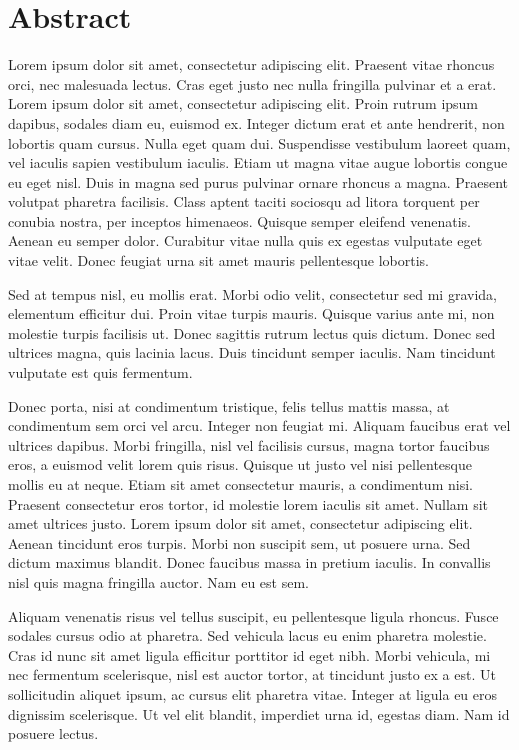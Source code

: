 \section{Abstract}

Lorem ipsum dolor sit amet, consectetur adipiscing elit. Praesent vitae rhoncus orci, nec malesuada lectus. Cras eget justo nec nulla fringilla pulvinar et a erat. Lorem ipsum dolor sit amet, consectetur adipiscing elit. Proin rutrum ipsum dapibus, sodales diam eu, euismod ex. Integer dictum erat et ante hendrerit, non lobortis quam cursus. Nulla eget quam dui. Suspendisse vestibulum laoreet quam, vel iaculis sapien vestibulum iaculis. Etiam ut magna vitae augue lobortis congue eu eget nisl. Duis in magna sed purus pulvinar ornare rhoncus a magna. Praesent volutpat pharetra facilisis. Class aptent taciti sociosqu ad litora torquent per conubia nostra, per inceptos himenaeos. Quisque semper eleifend venenatis. Aenean eu semper dolor. Curabitur vitae nulla quis ex egestas vulputate eget vitae velit. Donec feugiat urna sit amet mauris pellentesque lobortis.

Sed at tempus nisl, eu mollis erat. Morbi odio velit, consectetur sed mi gravida, elementum efficitur dui. Proin vitae turpis mauris. Quisque varius ante mi, non molestie turpis facilisis ut. Donec sagittis rutrum lectus quis dictum. Donec sed ultrices magna, quis lacinia lacus. Duis tincidunt semper iaculis. Nam tincidunt vulputate est quis fermentum.

Donec porta, nisi at condimentum tristique, felis tellus mattis massa, at condimentum sem orci vel arcu. Integer non feugiat mi. Aliquam faucibus erat vel ultrices dapibus. Morbi fringilla, nisl vel facilisis cursus, magna tortor faucibus eros, a euismod velit lorem quis risus. Quisque ut justo vel nisi pellentesque mollis eu at neque. Etiam sit amet consectetur mauris, a condimentum nisi. Praesent consectetur eros tortor, id molestie lorem iaculis sit amet. Nullam sit amet ultrices justo. Lorem ipsum dolor sit amet, consectetur adipiscing elit. Aenean tincidunt eros turpis. Morbi non suscipit sem, ut posuere urna. Sed dictum maximus blandit. Donec faucibus massa in pretium iaculis. In convallis nisl quis magna fringilla auctor. Nam eu est sem.

Aliquam venenatis risus vel tellus suscipit, eu pellentesque ligula rhoncus. Fusce sodales cursus odio at pharetra. Sed vehicula lacus eu enim pharetra molestie. Cras id nunc sit amet ligula efficitur porttitor id eget nibh. Morbi vehicula, mi nec fermentum scelerisque, nisl est auctor tortor, at tincidunt justo ex a est. Ut sollicitudin aliquet ipsum, ac cursus elit pharetra vitae. Integer at ligula eu eros dignissim scelerisque. Ut vel elit blandit, imperdiet urna id, egestas diam. Nam id posuere lectus.

